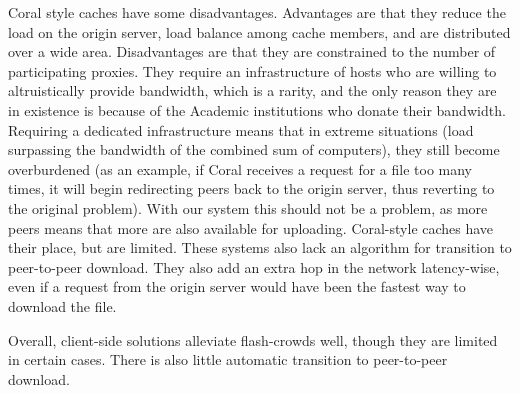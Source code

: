 Coral style caches have some disadvantages.  Advantages are that they reduce the load on the origin server, load balance among cache members, and are distributed over a wide area.  Disadvantages are that they are constrained to the number of participating proxies. They require an infrastructure of hosts who are willing to altruistically provide bandwidth, which is a rarity, and the only reason they are in existence is because of the Academic institutions who donate their bandwidth.  Requiring a dedicated infrastructure means that in extreme situations (load surpassing the bandwidth of the combined sum of computers), they still become overburdened (as an example, if Coral receives a request for a file too many times, it will begin redirecting peers back to the origin server, thus reverting to the original problem).  With our system this should not be a problem, as more peers means that more are also available for uploading.  Coral-style caches have their place, but are limited.  These systems also lack an algorithm for transition to peer-to-peer download.  They also add an extra hop in the network latency-wise, even if a request from the origin server would have been the fastest way to download the file.    


Overall, client-side solutions alleviate flash-crowds well, though they are limited in certain cases. There is also little automatic transition to peer-to-peer download.

